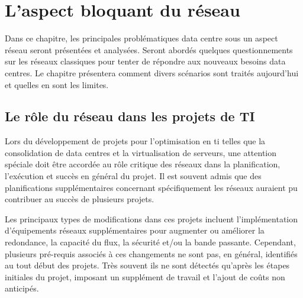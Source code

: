 


\chapter{L'aspect bloquant du réseau}
Dans ce chapitre, les principales problématiques data centre sous un aspect réseau seront présentées et analysées. Seront abordés quelques questionnements sur les réseaux classiques pour tenter de répondre aux nouveaux besoins data centres. Le chapitre présentera comment divers scénarios sont traités aujourd'hui et quelles en sont les limites. 


\section{Le rôle du réseau dans les projets de TI}

Lors du développement de projets pour l'optimisation en \gls{ti} telles que la consolidation de data centres et la virtualisation de serveurs, une attention spéciale doit être accordée au rôle critique des réseaux dans la planification, l'exécution et succès en général du projet. Il est souvent admis que des planifications supplémentaires concernant spécifiquement les réseaux auraient pu contribuer au succès de plusieurs projets.



Les principaux types de modifications dans ces projets incluent l'implémentation d'équipements réseaux supplémentaires pour augmenter ou améliorer la redondance, la capacité du flux, la sécurité et/ou la bande passante. Cependant, plusieurs pré-requis associés à ces changements ne sont pas, en général, identifiés au tout début des projets. Très souvent ils ne sont détectés qu'après les étapes initiales du projet, imposant un supplément de travail et l'ajout de coûts non anticipés.



